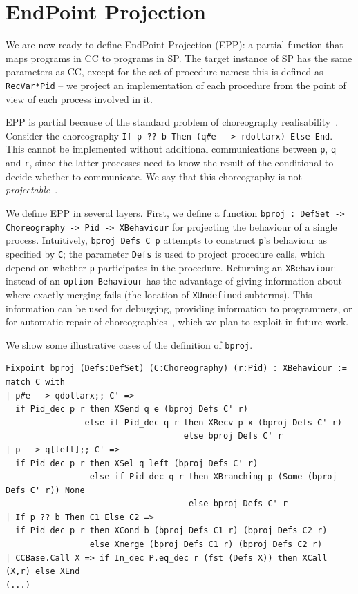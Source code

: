 \documentclass[runningheads]{llncs}
\begin{document}
\section{EndPoint Projection}
\label{sec:epp}

We are now ready to define EndPoint Projection (EPP): a partial function that maps programs in CC to
programs in SP. %
The target instance of SP has the same parameters as CC, except for the set of procedure names:
this is defined as \lstinline+RecVar*Pid+ -- we project an implementation of each procedure from the point of view of each process involved in it.

EPP is partial because of the standard problem of choreography realisability~\cite{BBO12}. Consider the choreography
\lstinline+If p ?? b Then (q#e --> rdollarx) Else End+.
This cannot be implemented without additional communications between \lstinline+p+,
\lstinline+q+ and \lstinline+r+, since the latter processes need to know the result of the
conditional to decide whether to communicate.
We say that this choreography is not \emph{projectable}~\cite{CM20}.

We define EPP in several layers.
First, we define a function \lstinline+bproj : DefSet ->+ \lstinline+Choreography -> Pid -> XBehaviour+ for projecting the behaviour of a single process.
Intuitively, \lstinline+bproj Defs C p+ attempts to construct \lstinline+p+'s behaviour as specified
by \lstinline+C+; the parameter \lstinline+Defs+ is used to project procedure calls, which depend on
whether \lstinline+p+ participates in the procedure.
Returning an \lstinline+XBehaviour+ instead of an \lstinline+option Behaviour+ has the
advantage of giving information about where exactly merging fails (the location of
\lstinline+XUndefined+ subterms).
This information can be used for debugging, providing information to programmers, or for automatic repair of choreographies~\cite{BB16,CM20}, which we plan to exploit in future work.

We show some illustrative cases of the definition of \lstinline+bproj+.
\begin{lstlisting}
Fixpoint bproj (Defs:DefSet) (C:Choreography) (r:Pid) : XBehaviour := match C with
| p#e --> qdollarx;; C' =>
  if Pid_dec p r then XSend q e (bproj Defs C' r)
                else if Pid_dec q r then XRecv p x (bproj Defs C' r)
                                    else bproj Defs C' r
| p --> q[left];; C' =>
  if Pid_dec p r then XSel q left (bproj Defs C' r)
                 else if Pid_dec q r then XBranching p (Some (bproj Defs C' r)) None
                                     else bproj Defs C' r
| If p ?? b Then C1 Else C2 =>
  if Pid_dec p r then XCond b (bproj Defs C1 r) (bproj Defs C2 r)
                 else Xmerge (bproj Defs C1 r) (bproj Defs C2 r)
| CCBase.Call X => if In_dec P.eq_dec r (fst (Defs X)) then XCall (X,r) else XEnd
(...)
\end{lstlisting}
\end{document}
